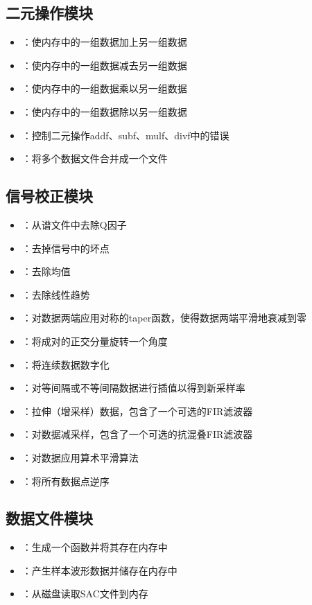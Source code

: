 \subsection*{二元操作模块}
\begin{itemize}
\item {}：使内存中的一组数据加上另一组数据
\item {}：使内存中的一组数据减去另一组数据
\item {}：使内存中的一组数据乘以另一组数据
\item {}：使内存中的一组数据除以另一组数据
\item {}：控制二元操作addf、subf、mulf、divf中的错误
\item {}：将多个数据文件合并成一个文件
\end{itemize}

\subsection*{信号校正模块}
\begin{itemize}
\item {}：从谱文件中去除Q因子
\item {}：去掉信号中的坏点
\item {}：去除均值
\item {}：去除线性趋势
\item {}：对数据两端应用对称的taper函数，使得数据两端平滑地衰减到零
\item {}：将成对的正交分量旋转一个角度
\item {}：将连续数据数字化
\item {}：对等间隔或不等间隔数据进行插值以得到新采样率
\item {}：拉伸（增采样）数据，包含了一个可选的FIR滤波器
\item {}：对数据减采样，包含了一个可选的抗混叠FIR滤波器
\item {}：对数据应用算术平滑算法
\item {}：将所有数据点逆序
\end{itemize}

\subsection*{数据文件模块}
\begin{itemize}
\item {}：生成一个函数并将其存在内存中
\item {}：产生样本波形数据并储存在内存中
\item {}：从磁盘读取SAC文件到内存
\end{itemize}

